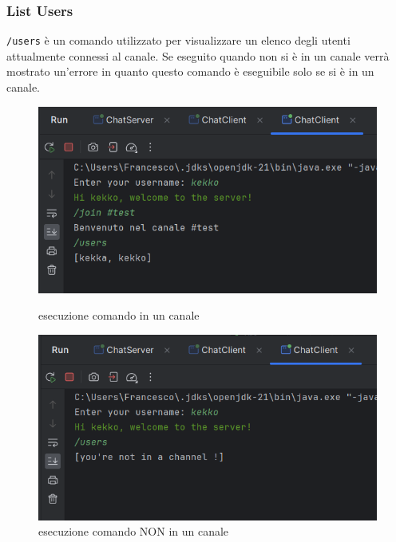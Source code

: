 \subsubsection{List Users}
\texttt{/users} è un comando utilizzato per visualizzare un elenco degli utenti attualmente connessi al canale. Se eseguito quando non si è in un canale verrà mostrato un'errore in quanto questo comando è eseguibile solo se si è in un canale.
\begin{figure}[h]
  \centering
  \begin{minipage}{0.45\textwidth}
    \includegraphics[width=\linewidth]{imagens/outputs/8.png}
    \caption{esecuzione comando in un canale}
  \end{minipage}\hfill
  \begin{minipage}{0.45\textwidth}
    \includegraphics[width=\linewidth]{imagens/outputs/8_2.png}
    \caption{esecuzione comando NON in un canale}
  \end{minipage}\hfill
\end{figure}

